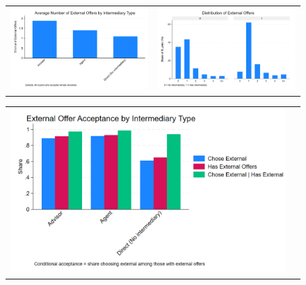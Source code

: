 \documentclass[12pt]{article}
\begin{document}
 
\begin{figure}[H]
\caption{}
 \label{fig:ie4_7and8}
\centering{}%
\begin{tabular}{cc}
\includegraphics[scale=0.27]{figures/IE4/IE4_external_offers_by_intermediary.png} & \includegraphics[scale=0.27]{figures/IE4/IE4_external_distribution_by_intermediary.png} 
\end{tabular}
\end{figure} 
 
\begin{figure}[H]
\caption{}
 \label{fig:ie4_9and10}
\centering{}%
\begin{tabular}{cc}
\includegraphics[scale=0.27]{figures/IE4/IE4_external_acceptance_by_intermediary.png} 
\end{tabular}
\end{figure} 
 
\end{document}
